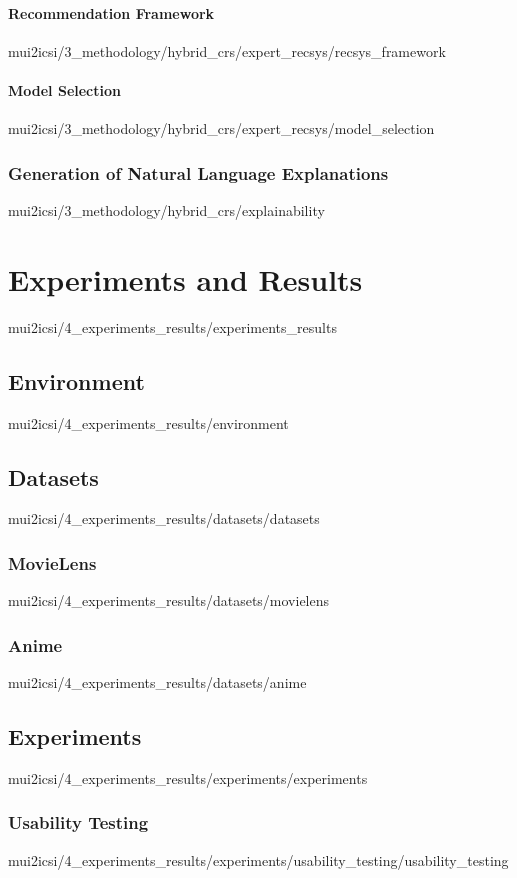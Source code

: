 \documentclass[english,epsbased,copyright,final,printable,covers,extendedindex,firstnumbered,tfm,gnuplot,loc,loe,lof,lot]{tfgtfmthesisuam}
\begin{document}
        \subsubsection{Recommendation Framework\label{SSS:RECFRAMEWORK}}{mui2icsi/3_methodology/hybrid_crs/expert_recsys/recsys_framework}
        \subsubsection{Model Selection\label{SSS:MODELSELECT}}{mui2icsi/3_methodology/hybrid_crs/expert_recsys/model_selection}
      \subsection{Generation of Natural Language Explanations\label{SS:GENEXPLAIN}}{mui2icsi/3_methodology/hybrid_crs/explainability}

  \chapter{Experiments and Results\label{CAP:EXPRES}}{mui2icsi/4_experiments_results/experiments_results}
    \section{Environment\label{SEC:ENVIRONMENT}}{mui2icsi/4_experiments_results/environment}

    \section{Datasets\label{SEC:DATASETS}}{mui2icsi/4_experiments_results/datasets/datasets}
      \subsection{MovieLens\label{SS:MOVIELENS}}{mui2icsi/4_experiments_results/datasets/movielens}
      \subsection{Anime\label{SS:LASTFM}}{mui2icsi/4_experiments_results/datasets/anime}

    \section{Experiments\label{SEC:EXPERIMENTS}}{mui2icsi/4_experiments_results/experiments/experiments}
      \subsection{Usability Testing\label{SS:USABILITYTEST}}{mui2icsi/4_experiments_results/experiments/usability_testing/usability_testing}
\end{document}
